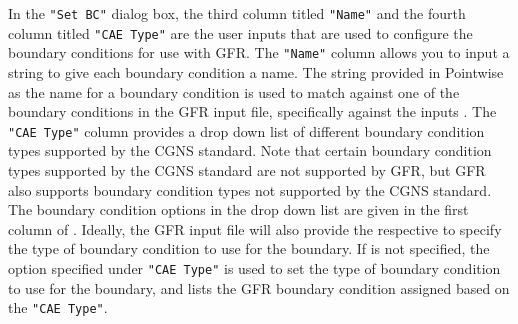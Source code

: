 In the \texttt{"Set BC"} dialog box, the third column titled \texttt{"Name"} and
the fourth column titled \texttt{"CAE Type"} are the user inputs that are used
to configure the boundary conditions for use with GFR.
%
The \texttt{"Name"} column allows you to input a string to give each boundary
condition a name.
%
The string provided in Pointwise as the name for a boundary condition is used to match
against one of the boundary conditions in the GFR input file, specifically
against the inputs .
%
The \texttt{"CAE Type"} column provides a drop down list of different boundary
condition types supported by the CGNS standard.
%
Note that certain boundary condition types supported by the CGNS standard are
not supported by GFR, but GFR also supports boundary condition types not
supported by the CGNS standard.
%
The boundary condition options in the drop down list are given in the first
column of .
%
Ideally, the GFR input file will also provide the respective
 to specify the type of
boundary condition to use for the boundary.
%
If  is not
specified, the option specified under \texttt{"CAE Type"} is used to set the
type of boundary condition to use for the boundary, and
 lists the GFR boundary condition assigned based on
the \texttt{"CAE Type"}.
%
%
